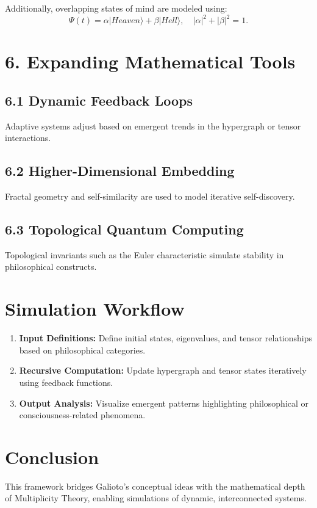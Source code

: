 \documentclass{article}
\theoremstyle{plain}
\theoremstyle{definition}
\begin{document}
Additionally, overlapping states of mind are modeled using:
\begin{equation}
    \Psi(t) = \alpha |Heaven\rangle + \beta |Hell\rangle, \quad |\alpha|^2 + |\beta|^2 = 1.
\end{equation}

\section*{6. Expanding Mathematical Tools}
\subsection*{6.1 Dynamic Feedback Loops}
Adaptive systems adjust based on emergent trends in the hypergraph or tensor interactions.
\subsection*{6.2 Higher-Dimensional Embedding}
Fractal geometry and self-similarity are used to model iterative self-discovery.
\subsection*{6.3 Topological Quantum Computing}
Topological invariants such as the Euler characteristic simulate stability in philosophical constructs.

\section*{Simulation Workflow}
\begin{enumerate}
    \item \textbf{Input Definitions:} Define initial states, eigenvalues, and tensor relationships based on philosophical categories.
    \item \textbf{Recursive Computation:} Update hypergraph and tensor states iteratively using feedback functions.
    \item \textbf{Output Analysis:} Visualize emergent patterns highlighting philosophical or consciousness-related phenomena.
\end{enumerate}

\section*{Conclusion}


This framework bridges Galioto’s conceptual ideas with the mathematical depth of Multiplicity Theory, enabling simulations of dynamic, interconnected systems.
\end{document}
